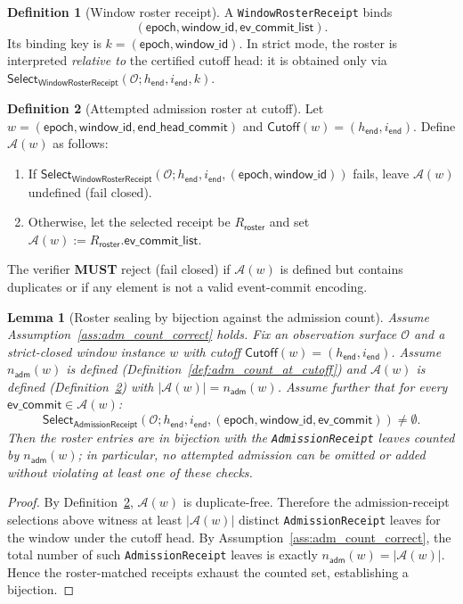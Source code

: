 \documentclass[11pt]{article}
\newcommand{\MUST}{\textbf{MUST}}
\newcommand{\code}[1]{\texttt{#1}}
\newcommand{\1}{\mathbf{1}}
\theoremstyle{definition}
\newtheorem{definition}{Definition}
\theoremstyle{plain}
\newtheorem{lemma}{Lemma}
\begin{document}
\begin{definition}[Window roster receipt]
\label{def:window_roster}
A \code{WindowRosterReceipt} binds
\[
(\textsf{epoch},\textsf{window\_id},\textsf{ev\_commit\_list}).
\]
Its binding key is $k=(\textsf{epoch},\textsf{window\_id})$.
In strict mode, the roster is interpreted \emph{relative to} the certified cutoff head: it is obtained only via $\mathsf{Select}_{\textsf{WindowRosterReceipt}}(\mathcal{O};h_{\textsf{end}},i_{\textsf{end}},k)$.
\end{definition}

\begin{definition}[Attempted admission roster at cutoff]
\label{def:attempted_roster}
Let $w=(\textsf{epoch},\textsf{window\_id},\textsf{end\_head\_commit})$ and $\textsf{Cutoff}(w)=(h_{\textsf{end}},i_{\textsf{end}})$.
Define $\mathcal{A}(w)$ as follows:
\begin{enumerate}[leftmargin=*]
\item If $\mathsf{Select}_{\textsf{WindowRosterReceipt}}(\mathcal{O};h_{\textsf{end}},i_{\textsf{end}},(\textsf{epoch},\textsf{window\_id}))$ fails, leave $\mathcal{A}(w)$ undefined (fail closed).
\item Otherwise, let the selected receipt be $R_{\textsf{roster}}$ and set $\mathcal{A}(w):=R_{\textsf{roster}}.\textsf{ev\_commit\_list}$.
\end{enumerate}
The verifier \MUST{} reject (fail closed) if $\mathcal{A}(w)$ is defined but contains duplicates or if any element is not a valid event-commit encoding.
\end{definition}

\begin{lemma}[Roster sealing by bijection against the admission count]
\label{lem:roster_complete}
Assume Assumption~\ref{ass:adm_count_correct} holds.
Fix an observation surface $\mathcal{O}$ and a strict-closed window instance $w$ with cutoff $\textsf{Cutoff}(w)=(h_{\textsf{end}},i_{\textsf{end}})$.
Assume $n_{\textsf{adm}}(w)$ is defined (Definition~\ref{def:adm_count_at_cutoff}) and $\mathcal{A}(w)$ is defined (Definition~\ref{def:attempted_roster}) with $|\mathcal{A}(w)|=n_{\textsf{adm}}(w)$.
Assume further that for every $\textsf{ev\_commit}\in\mathcal{A}(w)$:
\[
\mathsf{Select}_{\textsf{AdmissionReceipt}}(\mathcal{O};h_{\textsf{end}},i_{\textsf{end}},(\textsf{epoch},\textsf{window\_id},\textsf{ev\_commit}))\ne\emptyset.
\]
Then the roster entries are in bijection with the \code{AdmissionReceipt} leaves counted by $n_{\textsf{adm}}(w)$; in particular, no attempted admission can be omitted or added without violating at least one of these checks.
\end{lemma}
\begin{proof}
By Definition~\ref{def:attempted_roster}, $\mathcal{A}(w)$ is duplicate-free.
Therefore the admission-receipt selections above witness at least $|\mathcal{A}(w)|$ distinct \code{AdmissionReceipt} leaves for the window under the cutoff head.
By Assumption~\ref{ass:adm_count_correct}, the total number of such \code{AdmissionReceipt} leaves is exactly $n_{\textsf{adm}}(w)=|\mathcal{A}(w)|$.
Hence the roster-matched receipts exhaust the counted set, establishing a bijection.
\end{proof}
\end{document}
